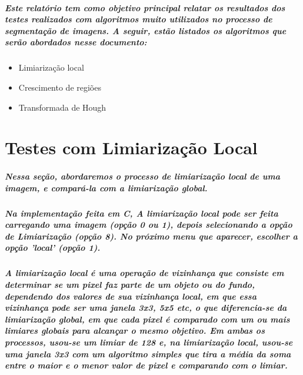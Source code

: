 \documentclass[12pt,fleqn]{article}
\begin{document}


  \subparagraph{\normalfont Este relatório tem como objetivo principal relatar os resultados dos testes realizados com algoritmos muito utilizados no processo de segmentação de imagens. A seguir, estão listados os algoritmos que serão abordados nesse documento:}

\begin{itemize}
  \item Limiarização local
  \item Crescimento de regiões
  \item Transformada de Hough
\end{itemize}


\section{Testes com Limiarização Local}

  \subparagraph{\normalfont Nessa seção, abordaremos o processo de limiarização local de uma imagem, e compará-la com a limiarização global.}

  \subparagraph{\normalfont Na implementação feita em C, A limiarização local
  pode ser feita carregando uma imagem (opção 0 ou 1), depois selecionando a opção de Limiarização (opção 8). No próximo menu que aparecer, escolher a opção 'local' (opção 1).} 
  

   \subparagraph{\normalfont A limiarização local é uma operação de vizinhança que consiste em determinar se um pixel faz parte de um objeto ou do fundo, dependendo dos valores de sua vizinhança local, em que essa vizinhança pode ser uma janela 3x3, 5x5 etc, o que diferencia-se da limiarização global, em que cada pixel é comparado com um ou mais limiares globais para alcançar o mesmo objetivo. Em ambas os processos, usou-se um limiar de 128 e, na limiarização local, usou-se uma janela 3x3 com um algoritmo simples que tira a média da soma entre o maior e o menor valor de pixel e comparando com o limiar. }
   
\end{document}
